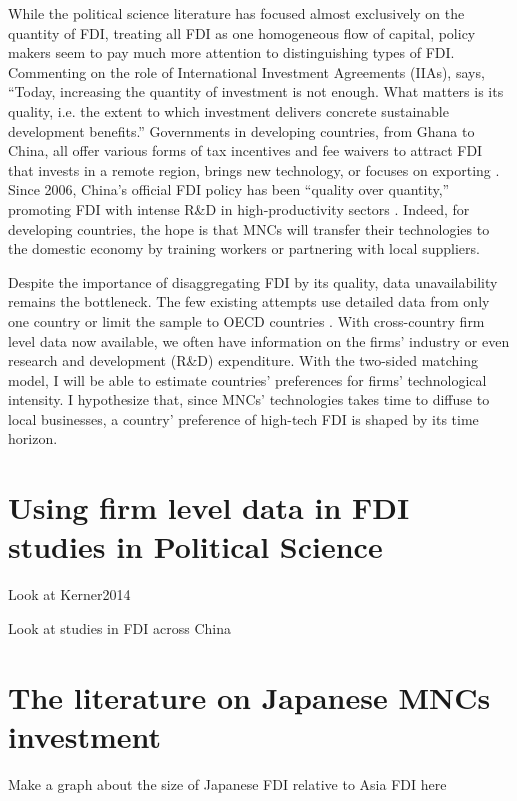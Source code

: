 While the political science literature has focused almost exclusively on the quantity of FDI, treating all FDI as one homogeneous flow of capital, policy makers seem to pay much more attention to distinguishing types of FDI. Commenting on the role of International Investment Agreements (IIAs), \citet{UNCTAD2015} says, ``Today, increasing the quantity of investment is not enough. What matters is its quality, i.e. the extent to which investment delivers concrete sustainable development benefits.'' Governments in developing countries, from Ghana to China, all offer various forms of tax incentives and fee waivers to attract FDI that invests in a remote region, brings new technology, or focuses on exporting \citep{Ricupero2000}. Since 2006, China's official FDI policy has been ``quality over quantity,'' promoting FDI with intense R\&D in high-productivity sectors \citep{Guangzhou2011}. Indeed, for developing countries, the hope is that MNCs will transfer their technologies to the domestic economy by training workers or partnering with local suppliers.

Despite the importance of disaggregating FDI by its quality, data unavailability remains the bottleneck. The few existing attempts use detailed data from only one country or limit the sample to OECD countries \citep{Alfaro2003, Alfaro2007, Javorcik2004}. With cross-country firm level data now available, we often have information on the firms' industry or even research and development (R\&D) expenditure. With the two-sided matching model, I will be able to estimate countries' preferences for firms' technological intensity. I hypothesize that, since MNCs' technologies takes time to diffuse to local businesses, a country' preference of high-tech FDI is shaped by its time horizon.

\section{Using firm level data in FDI studies in Political Science}

Look at Kerner2014

Look at studies in FDI across China

\section{The literature on Japanese MNCs investment}

Make a graph about the size of Japanese FDI relative to Asia FDI here

